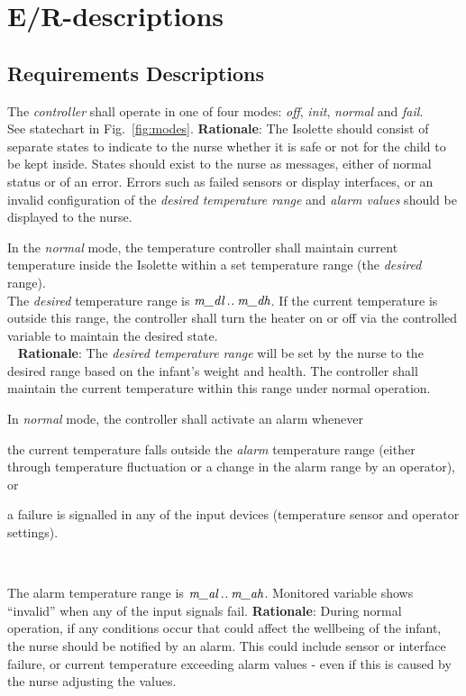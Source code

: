 \section{E/R-descriptions}

\subsection{Requirements Descriptions}
{The \emph{controller} shall operate in one of four modes: \emph{off}, \emph{init}, \emph{normal} and \emph{fail}.\\}
{See statechart in Fig.~\ref{fig:modes}.}
\label{R1}
\noindent \textbf{Rationale}: The Isolette should consist of separate states to indicate to the nurse whether it is safe or not for the child to be kept inside. States should exist to the nurse as messages, either of normal status or of an error. Errors such as failed sensors or display interfaces, or an invalid configuration of the \emph{desired temperature range} and \emph{alarm values} should be displayed to the nurse.

{In the \emph{normal} mode, the temperature controller shall maintain current temperature inside the Isolette within a set temperature range (the \emph{desired} range).\\}
{The \emph{desired} temperature range is $\textit{m\_dl} \mathbin{.\mkern1mu.} \textit{m\_dh}$. If the current temperature  is outside this range, the controller shall turn the heater on or off via the controlled variable  to maintain the desired state.\\~}
\label{R2}
\noindent \textbf{Rationale}: The \emph{desired temperature range} will be set by the nurse to the desired range based on the infant's weight and health. The controller shall maintain the current temperature within this range under normal operation.

{In \emph{normal} mode, the controller shall activate an alarm whenever 

\begin{mylist}
\item the current temperature falls outside the \emph{alarm} temperature range (either through temperature fluctuation or a change in the alarm range by an operator), or
\item a failure is signalled in any of the input devices (temperature sensor and operator settings).
\end{mylist}~}
{The alarm temperature range is $\textit{m\_al}\mathbin{.\mkern1mu.}\textit{m\_ah}$.
Monitored variable  
shows ``invalid'' when any of the input signals fail.}
\label{R3}
\noindent \textbf{Rationale}: During normal operation, if any conditions occur that could affect the wellbeing of the infant, the nurse should be notified by an alarm. This could include sensor or interface failure, or current temperature exceeding alarm values - even if this is caused by the nurse adjusting the values.


